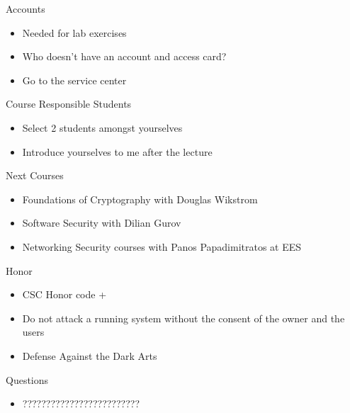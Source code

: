 \documentclass{beamer}
\begin{document}
\begin{frame}{Accounts}
  \begin{itemize}
  \item Needed for lab exercises
  \item Who doesn't have an account and access card?
  \item Go to the service center
  \end{itemize}
\end{frame}

\begin{frame}{Course Responsible Students }
  \begin{itemize}
  \item Select 2 students amongst yourselves 
  \item Introduce yourselves to me after the lecture 
  \end{itemize}
\end{frame}


\begin{frame}{Next Courses}
  \begin{itemize}
  \item Foundations of Cryptography with Douglas Wikstr\:om
  \item Software Security with Dilian Gurov
  \item Networking Security courses with Panos
    Papadimitratos at EES
  \end{itemize}
\end{frame}

\begin{frame}{Honor}
  \begin{itemize}
  \item CSC Honor code +
  \item \alert{Do not attack a running system 
    without the consent of the owner 
    and the users}
  \item Defense Against the Dark Arts
  \end{itemize}
\end{frame}

\begin{frame}{Questions}
  \begin{itemize}
  \item ?????????????????????????
  \end{itemize}
\end{frame}
\end{document}
